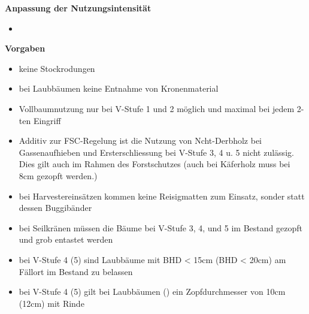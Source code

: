 \documentclass{article}
\begin{document}
\textbf{Anpassung der Nutzungsintensität}\\

\begin{itemize}
	
	\item 



\end{itemize} 


\textbf{Vorgaben}\\

\begin{itemize}
	
	\item keine Stockrodungen
	
	\item bei Laubbäumen keine Entnahme von Kronenmaterial
	
	\item Vollbaumnutzung nur bei V-Stufe 1 und 2 möglich und maximal bei jedem 2-ten Eingriff
	
	\item Additiv zur FSC-Regelung ist die Nutzung von Ncht-Derbholz bei Gassenaufhieben und Ersterschliessung bei V-Stufe 3, 4 u. 5 nicht zulässig. Dies gilt auch im Rahmen des Forstschutzes (auch bei Käferholz muss bei 8cm gezopft werden.)
	
	\item bei Harvestereinsätzen kommen keine Reisigmatten zum Einsatz, sonder statt dessen Buggibänder
	
	\item bei Seilkränen müssen die Bäume bei V-Stufe 3, 4, und 5 im Bestand gezopft und grob entastet werden
	
	\item bei V-Stufe 4 (5) sind Laubbäume mit BHD < 15cm (BHD < 20cm) am Fällort im Bestand zu belassen
	
	\item bei V-Stufe 4 (5) gilt bei Laubbäumen () ein Zopfdurchmesser von 10cm (12cm) mit Rinde
	
	
	
\end{itemize} 

\newpage

\end{document}
